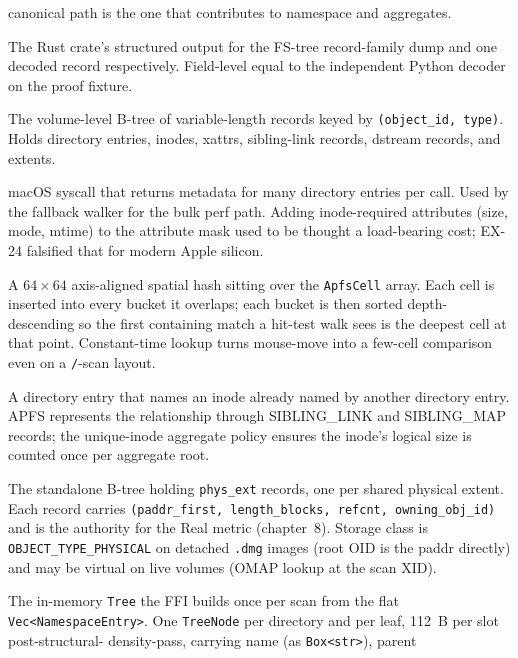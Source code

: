 \begin{description}
    canonical path is the one that contributes to namespace and
    aggregates.
  \item[\texttt{FsRecordDump} / \texttt{FsRecordRow}.] The Rust
    crate's structured output for the FS-tree record-family dump
    and one decoded record respectively. Field-level equal to the
    independent Python decoder on the proof fixture.
  \item[FS tree.] The volume-level B-tree of variable-length
    records keyed by \texttt{(object\_id, type)}. Holds directory
    entries, inodes, xattrs, sibling-link records, dstream
    records, and extents.
  \item[\texttt{getattrlistbulk}.] macOS syscall that returns
    metadata for many directory entries per call. Used by the
    fallback walker for the bulk perf path. Adding inode-required
    attributes (size, mode, mtime) to the attribute mask used to
    be thought a load-bearing cost; EX-24 falsified that for
    modern Apple silicon.
  \item[Hit-grid.] A $64 \times 64$ axis-aligned spatial
    hash sitting over the \texttt{ApfsCell} array. Each cell is
    inserted into every bucket it overlaps; each bucket is then
    sorted depth-descending so the first containing match a
    hit-test walk sees is the deepest cell at that point.
    Constant-time lookup turns mouse-move into a few-cell
    comparison even on a \texttt{/}-scan layout.
  \item[Hard link.] A directory entry that names an inode already
    named by another directory entry. APFS represents the
    relationship through SIBLING\_LINK and SIBLING\_MAP records;
    the unique-inode aggregate policy ensures the inode's logical
    size is counted once per aggregate root.
  \item[Extent-reference tree.] The standalone B-tree holding
    \texttt{phys\_ext} records, one per shared physical extent.
    Each record carries \texttt{(paddr\_first, length\_blocks,
    refcnt, owning\_obj\_id)} and is the authority for the Real
    metric (chapter~8). Storage class is
    \texttt{OBJECT\_TYPE\_PHYSICAL} on detached
    \texttt{.dmg} images (root OID is the paddr directly) and
    may be virtual on live volumes (OMAP lookup at the scan XID).
  \item[Indexed tree.] The in-memory \texttt{Tree} the FFI
    builds once per scan from the flat
    \texttt{Vec<NamespaceEntry>}. One \texttt{TreeNode} per
    directory and per leaf, 112~B per slot post-structural-
    density-pass, carrying name (as \texttt{Box<str>}), parent

\end{description}
